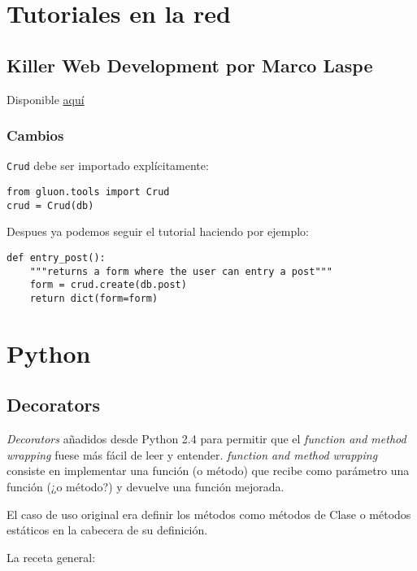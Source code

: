 \documentclass[12pt,spanish,]{article}
\begin{document}
\section{Tutoriales en la red}\label{tutoriales-en-la-red}

\subsection{Killer Web Development por Marco
Laspe}\label{killer-web-development-por-marco-laspe}

Disponible \href{http://killer-web-development.com}{aquí}

\subsubsection{Cambios}\label{cambios}

\texttt{Crud} debe ser importado explícitamente:

\begin{verbatim}
from gluon.tools import Crud
crud = Crud(db)
\end{verbatim}

Despues ya podemos seguir el tutorial haciendo por ejemplo:

\begin{verbatim}
def entry_post():
    """returns a form where the user can entry a post"""
    form = crud.create(db.post)
    return dict(form=form)
\end{verbatim}

\section{Python}\label{python}

\subsection{Decorators}\label{decorators}

\emph{Decorators} añadidos desde Python 2.4 para permitir que el
\emph{function and method wrapping} fuese más fácil de leer y entender.
\emph{function and method wrapping} consiste en implementar una función
(o método) que recibe como parámetro una función (¿o método?) y devuelve
una función mejorada.

El caso de uso original era definir los métodos como métodos de Clase o
métodos estáticos en la cabecera de su definición.

La receta general:
\end{document}
